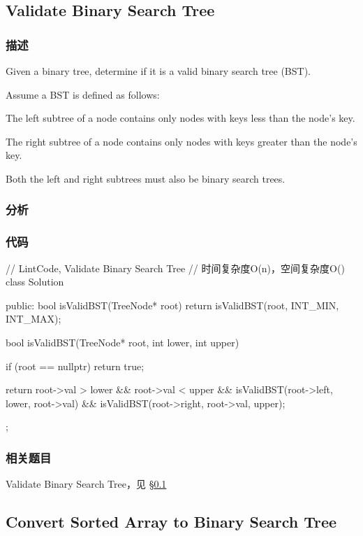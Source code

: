 \subsection{Validate Binary Search Tree}
\label{sec:validate-binary-search-tree}


\subsubsection{描述}
Given a binary tree, determine if it is a valid binary search tree (BST).

Assume a BST is defined as follows:
\begindot
\item The left subtree of a node contains only nodes with keys less than the node's key.
\item The right subtree of a node contains only nodes with keys greater than the node's key.
\item Both the left and right subtrees must also be binary search trees.
\myenddot


\subsubsection{分析}


\subsubsection{代码}

\begin{Code}
// LintCode, Validate Binary Search Tree
// 时间复杂度O(n)，空间复杂度O(\logn)
class Solution {
public:
    bool isValidBST(TreeNode* root) {
        return isValidBST(root, INT_MIN, INT_MAX);
    }

    bool isValidBST(TreeNode* root, int lower, int upper) {
        if (root == nullptr) return true;

        return root->val > lower && root->val < upper
                && isValidBST(root->left, lower, root->val)
                && isValidBST(root->right, root->val, upper);
    }
};
\end{Code}


\subsubsection{相关题目}
\begindot
\item Validate Binary Search Tree，见 \S \ref{sec:validate-binary-search-tree}
\myenddot


\subsection{Convert Sorted Array to Binary Search Tree}
\label{sec:convert-sorted-array-to-binary-search-tree}


